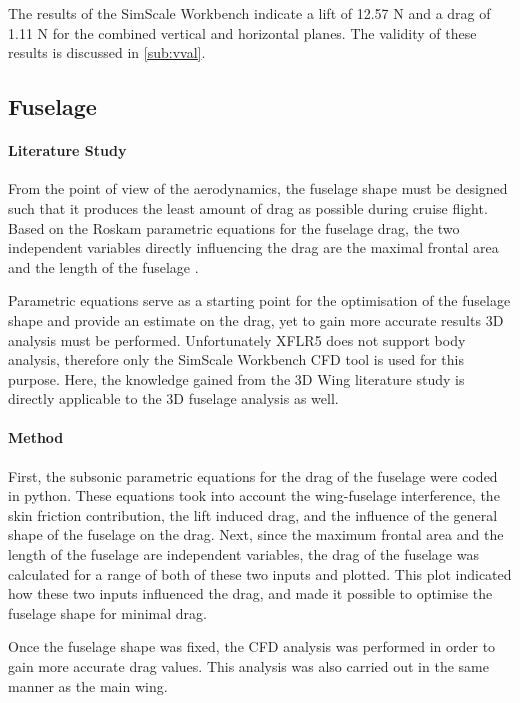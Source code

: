 The results of the SimScale Workbench indicate a lift of 12.57 N and a drag of 1.11 N for the combined vertical and horizontal planes. The validity of these results is discussed in \autoref{sub:vval}.

\subsection{Fuselage}
\label{sec:aero_fuse}

\paragraph{Literature Study} From the point of view of the aerodynamics, the fuselage shape must be designed such that it produces the least amount of drag as possible during cruise flight. Based on the Roskam parametric equations for the fuselage drag, the two independent variables directly influencing the drag are the maximal frontal area and the length of the fuselage \cite[44]{roskam}.

Parametric equations serve as a starting point for the optimisation of the fuselage shape and provide an estimate on the drag, yet to gain more accurate results 3D analysis must be performed. Unfortunately XFLR5 does not support body analysis, therefore only the SimScale Workbench CFD tool is used for this purpose. Here, the knowledge gained from the 3D Wing literature study is directly applicable to the 3D fuselage analysis as well.

\paragraph{Method} First, the subsonic parametric equations for the drag of the fuselage were coded in python. These equations took into account the wing-fuselage interference, the skin friction contribution, the lift induced drag, and the influence of the general shape of the fuselage on the drag. Next, since the maximum frontal area and the length of the fuselage are independent variables, the drag of the fuselage was calculated for a range of both of these two inputs and plotted. This plot indicated how these two inputs influenced the drag, and made it possible to optimise the fuselage shape for minimal drag.

Once the fuselage shape was fixed, the CFD analysis was performed in order to gain more accurate drag values. This analysis was also carried out in the same manner as the main wing.


